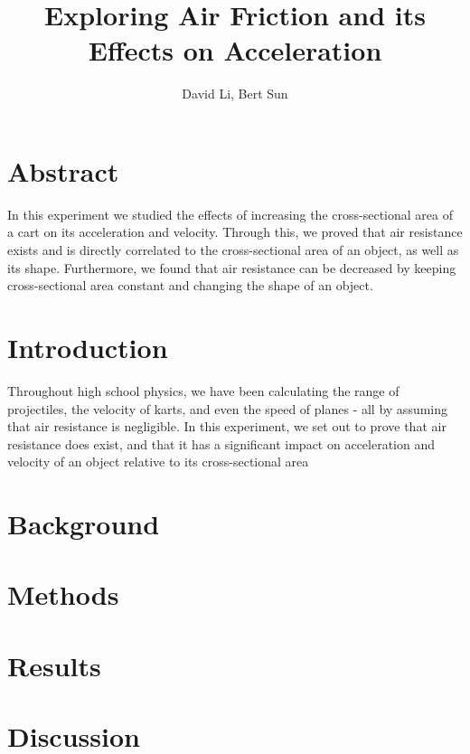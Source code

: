 \documentclass[
    letterpaper,
    man,
    floatsintext,
    british
]{apa6}
\title{Exploring Air Friction and its Effects on Acceleration}
\author{David Li, Bert Sun}
\affiliation{John Fraser Secondary School}
\begin{document}
\maketitle

\section{Abstract}
In this experiment we studied the effects of increasing the cross-sectional area of a cart on its acceleration and velocity.
Through this, we proved that air resistance exists and is directly correlated to the cross-sectional area of an object, as well as its shape. Furthermore, we found that air resistance can be decreased by keeping cross-sectional area constant and changing the shape of an object.

\section{Introduction}

Throughout high school physics, we have been calculating the range of projectiles, the velocity of karts, and even the speed of planes - all by assuming that air resistance is negligible.
In this experiment, we set out to prove that air resistance does exist, and that it has a significant impact on acceleration and velocity of an object relative to its cross-sectional area

\section{Background}


\section{Methods}



\newpage
\section{Results}

% 

\section{Discussion}


\nocite{*}
\printbibliography


\end{document}
